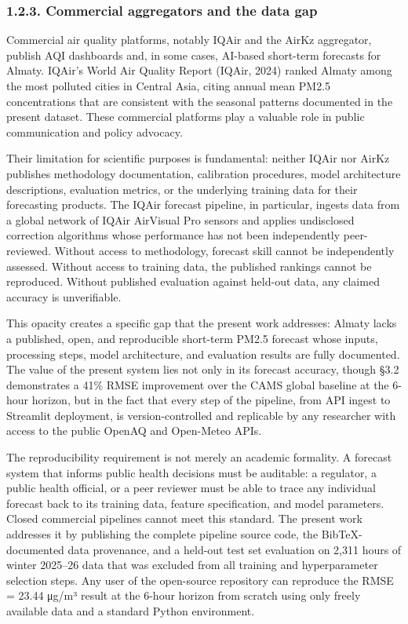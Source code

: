 \subsubsection{1.2.3. Commercial aggregators and the data gap}\label{commercial-aggregators-and-the-data-gap}

Commercial air quality platforms, notably IQAir and the AirKz aggregator, publish AQI dashboards and, in some cases, AI-based short-term forecasts for Almaty. IQAir's World Air Quality Report (IQAir, 2024) ranked Almaty among the most polluted cities in Central Asia, citing annual mean PM2.5 concentrations that are consistent with the seasonal patterns documented in the present dataset. These commercial platforms play a valuable role in public communication and policy advocacy.

Their limitation for scientific purposes is fundamental: neither IQAir nor AirKz publishes methodology documentation, calibration procedures, model architecture descriptions, evaluation metrics, or the underlying training data for their forecasting products. The IQAir forecast pipeline, in particular, ingests data from a global network of IQAir AirVisual Pro sensors and applies undisclosed correction algorithms whose performance has not been independently peer-reviewed. Without access to methodology, forecast skill cannot be independently assessed. Without access to training data, the published rankings cannot be reproduced. Without published evaluation against held-out data, any claimed accuracy is unverifiable.

This opacity creates a specific gap that the present work addresses: Almaty lacks a published, open, and reproducible short-term PM2.5 forecast whose inputs, processing steps, model architecture, and evaluation results are fully documented. The value of the present system lies not only in its forecast accuracy, though §3.2 demonstrates a 41\% RMSE improvement over the CAMS global baseline at the 6-hour horizon, but in the fact that every step of the pipeline, from API ingest to Streamlit deployment, is version-controlled and replicable by any researcher with access to the public OpenAQ and Open-Meteo APIs.

The reproducibility requirement is not merely an academic formality. A forecast system that informs public health decisions must be auditable: a regulator, a public health official, or a peer reviewer must be able to trace any individual forecast back to its training data, feature specification, and model parameters. Closed commercial pipelines cannot meet this standard. The present work addresses it by publishing the complete pipeline source code, the BibTeX-documented data provenance, and a held-out test set evaluation on 2,311 hours of winter 2025--26 data that was excluded from all training and hyperparameter selection steps. Any user of the open-source repository can reproduce the RMSE = 23.44 μg/m³ result at the 6-hour horizon from scratch using only freely available data and a standard Python environment.

